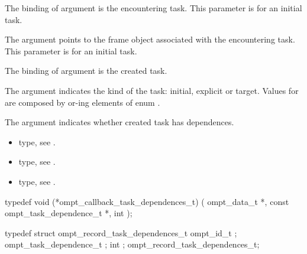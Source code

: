 \argdesc

The binding of argument  is the
encountering task.
This parameter is  for an initial task.

The argument  points to the frame object
associated with the encountering task.
This parameter is  for an initial task.

The binding of argument  is the created
task.

The argument  indicates the kind of the task: initial,
explicit or target.
Values for  are composed by or-ing elements of enum
.

The argument  indicates whether created
task has dependences.

\codeptrdesc

\crossreferences
\begin{itemize}
\item {} type, see
.
\item {} type, see
.
\item {} type, see
.
\end{itemize}



\label{sec:ompt_callback_task_dependences_t}
\format

\begin{ccppspecific}
\begin{omptCallback}
typedef void (*ompt_callback_task_dependences_t) (
  ompt_data_t *,
  const ompt_task_dependence_t *,
  int 
);
\end{omptCallback}
\end{ccppspecific}


\record

\begin{ccppspecific}
\begin{omptRecord}
typedef struct ompt_record_task_dependences_t {
  ompt_id_t ;
  ompt_task_dependence_t ;
  int ;
} ompt_record_task_dependences_t;
\end{omptRecord}
\end{ccppspecific}



